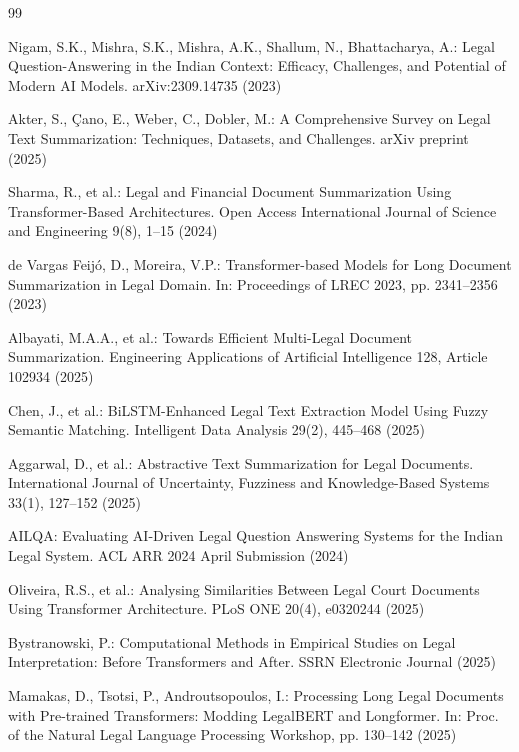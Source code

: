 \documentclass{llncs}
\begin{document}
\begin{thebibliography}{99}

Nigam, S.K., Mishra, S.K., Mishra, A.K., Shallum, N., Bhattacharya, A.: Legal Question-Answering in the Indian Context: Efficacy, Challenges, and Potential of Modern AI Models. arXiv:2309.14735 (2023)

Akter, S., Çano, E., Weber, C., Dobler, M.: A Comprehensive Survey on Legal Text Summarization: Techniques, Datasets, and Challenges. arXiv preprint (2025)

Sharma, R., et al.: Legal and Financial Document Summarization Using Transformer-Based Architectures. Open Access International Journal of Science and Engineering 9(8), 1--15 (2024)

de Vargas Feijó, D., Moreira, V.P.: Transformer-based Models for Long Document Summarization in Legal Domain. In: Proceedings of LREC 2023, pp. 2341--2356 (2023)

Albayati, M.A.A., et al.: Towards Efficient Multi-Legal Document Summarization. Engineering Applications of Artificial Intelligence 128, Article 102934 (2025)

Chen, J., et al.: BiLSTM-Enhanced Legal Text Extraction Model Using Fuzzy Semantic Matching. Intelligent Data Analysis 29(2), 445--468 (2025)

Aggarwal, D., et al.: Abstractive Text Summarization for Legal Documents. International Journal of Uncertainty, Fuzziness and Knowledge-Based Systems 33(1), 127--152 (2025)

AILQA: Evaluating AI-Driven Legal Question Answering Systems for the Indian Legal System. ACL ARR 2024 April Submission (2024)

Oliveira, R.S., et al.: Analysing Similarities Between Legal Court Documents Using Transformer Architecture. PLoS ONE 20(4), e0320244 (2025)

Bystranowski, P.: Computational Methods in Empirical Studies on Legal Interpretation: Before Transformers and After. SSRN Electronic Journal (2025)

Mamakas, D., Tsotsi, P., Androutsopoulos, I.: Processing Long Legal Documents with Pre-trained Transformers: Modding LegalBERT and Longformer. In: Proc. of the Natural Legal Language Processing Workshop, pp. 130--142 (2025)


\end{thebibliography}
\end{document}
